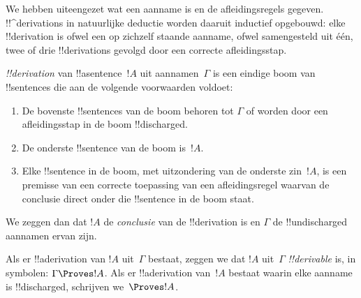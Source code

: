 \documentclass[../../../include/open-logic-section]{subfiles}
\begin{document}
      {}
      {}


\begin{explain}
We hebben uiteengezet wat een aanname is en de afleidingsregels
gegeven. !!^{derivation}s in natuurlijke deductie worden daaruit
inductief opgebouwd: elke !!{derivation} is ofwel een op zichzelf
staande aanname, ofwel samengesteld uit één, twee of drie
!!{derivation}s gevolgd door een correcte afleidingsstap.
\end{explain}

\begin{defn}[!!^{derivation}]
 \emph{!!{derivation}} van !!a{sentence}~$!A$ uit
aannamen~$\Gamma$ is een eindige boom van !!{sentence}s die aan de
volgende voorwaarden voldoet:
\begin{enumerate}
\item De bovenste !!{sentence}s van de boom behoren tot $\Gamma$ of
  worden door een afleidingsstap in de boom !!{discharged}.
\item De onderste !!{sentence} van de boom is~$!A$.
\item Elke !!{sentence} in de boom, met uitzondering van de onderste
  zin~$!A$, is een premisse van een correcte toepassing van een
  afleidingsregel waarvan de conclusie direct onder die !!{sentence}
  in de boom staat.
\end{enumerate}
We zeggen dan dat $!A$ de \emph{conclusie} van de !!{derivation} is en
$\Gamma$ de !!{undischarged} aannamen ervan zijn.

Als er !!a{derivation} van $!A$ uit~$\Gamma$ bestaat, zeggen we dat
$!A$ uit~$\Gamma$ \emph{!!{derivable}} is, in symbolen: $\Gamma
\Proves !A$. Als er !!a{derivation} van~$!A$ bestaat waarin elke
aanname is !!{discharged}, schrijven we~$\Proves !A$.
\end{defn}
\end{document}
